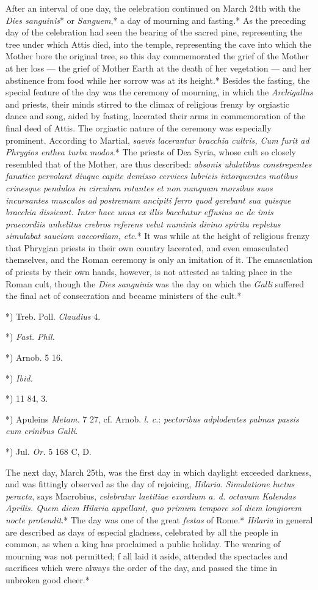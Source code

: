 \documentclass[a4paper, 11pt, oneside, polutonikogreek, english]{article}
\begin{document}
After an interval of one day, the celebration continued on March 24th with the \emph{Dies sanguinis}* or \emph{Sanguem},* a day of mourning and fasting.* As the preceding day of the celebration had seen the bearing of the sacred pine, representing the tree under which Attis died, into the temple, representing the cave into which the Mother bore the original tree, so this day commemorated the grief of the Mother at her loss --- the grief of Mother Earth at the death of her vegetation --- and her abstinence from food while her sorrow was at its height.* Besides the fasting, the special feature of the day was the ceremony of mourning, in which the \emph{Archigallus} and priests, their minds stirred to the climax of religious frenzy by orgiastic dance and song, aided by fasting, lacerated their arms in commemoration of the final deed of Attis. The orgiastic nature of the ceremony was especially prominent. According to Martial, \emph{saevis lacerantur bracchia cultris, Cum furit ad Phrygios enthea turba modos}.* The priests of Dea Syria, whose cult so closely resembled that of the Mother, are thus described: \emph{absonis ululatibus constrepentes fanatice pervolant diuque capite demisso cervices lubricis intorquentes motibus crinesque pendulos in circulum rotantes et non nunquam morsibus suos incursantes musculos ad postremum ancipiti ferro quod gerebant sua quisque bracchia dissicant. Inter haec unus ex illis bacchatur effusius ac de imis praecordiis anhelitus crebros referens velut numinis divino spiritu repletus simulabat sauciam vaecordiam, etc.}* It was while at the height of religious frenzy that Phrygian priests in their own country lacerated, and even emasculated themselves, and the Roman ceremony is only an imitation of it. The emasculation of priests by their own hands, however, is not attested as taking place in the Roman cult, though the \emph{Dies sanguinis} was the day on which the \emph{Galli} suffered the final act of consecration and became ministers of the cult.*

*) Treb. Poll. \emph{Claudius} 4.

*) \emph{Fast. Phil.}

*) Arnob. 5 16.

*) \emph{Ibid.}

*) 11 84, 3.

*) Apuleins \emph{Metam.} 7 27, cf. Arnob. \emph{l. c.}: \emph{pectoribus adplodentes palmas passis cum crinibus Galli}.

*) Jul. \emph{Or.} 5 168 C, D.

The next day, March 25th, was the first day in which daylight exceeded darkness, and was fittingly observed as the day of rejoicing, \emph{Hilaria}. \emph{Simulatione luctus peracta}, says Macrobius, \emph{celebratur laetitiae exordium a. d. octavum Kalendas Aprilis. Quem diem Hilaria appellant, quo primum tempore sol diem longiorem nocte protendit}.* The day was one of the great \emph{festas} of Rome.* \emph{Hilaria} in general are described as days of especial gladness, celebrated by all the people in common, as when a king has proclaimed a public holiday. The wearing of mourning was not permitted; f all laid it aside, attended the spectacles and sacrifices which were always the order of the day, and passed the time in unbroken good cheer.*
\end{document}
